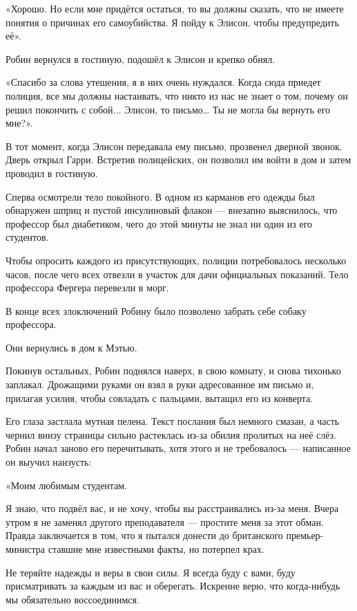 \documentclass[a5paper, 9pt,
final, openany, twoside=true]{memoir}
\begin{document}
«Хорошо. Но если мне придётся остаться, то вы должны сказать, что не имеете понятия о причинах его самоубийства. Я пойду к Элисон, чтобы предупредить её».

Робин вернулся в гостиную, подошёл к Элисон и крепко обнял.

«Спасибо за слова утешения, я в них очень нуждался. Когда сюда приедет полиция, все мы должны настаивать, что никто из нас не знает о том, почему он решил покончить с собой... Элисон, то письмо… Ты не могла бы вернуть его мне?».

В тот момент, когда Элисон передавала ему письмо, прозвенел дверной звонок. Дверь открыл Гарри. Встретив полицейских, он позволил им войти в дом и затем проводил в гостиную.

Сперва осмотрели тело покойного. В одном из карманов его одежды был обнаружен шприц и пустой инсулиновый флакон — внезапно выяснилось, что профессор был диабетиком, чего до этой минуты не знал ни один из его студентов.

Чтобы опросить каждого из присутствующих, полиции потребовалось несколько часов, после чего всех отвезли в участок для дачи официальных показаний. Тело профессора Фергера перевезли в морг.

В конце всех злоключений Робину было позволено забрать себе собаку профессора.\bigskip

Они вернулись в дом к Мэтью.

Покинув остальных, Робин поднялся наверх, в свою комнату, и снова тихонько заплакал. Дрожащими руками он взял в руки адресованное им письмо и, прилагая усилия, чтобы совладать с пальцами, вытащил его из конверта.

Его глаза застлала мутная пелена. Текст послания был немного смазан, а часть чернил внизу страницы сильно растеклась из-за обилия пролитых на неё слёз. Робин начал заново его перечитывать, хотя этого и не требовалось — написанное он выучил наизусть:\bigskip

«Моим любимым студентам.\bigskip

Я знаю, что подвёл вас, и не хочу, чтобы вы расстраивались из-за меня. Вчера утром я не заменял другого преподавателя — простите меня за этот обман. Правда заключается в том, что я пытался донести до британского премьер-министра ставшие мне известными факты, но потерпел крах.

Не теряйте надежды и веры в свои силы. Я всегда буду с вами, буду присматривать за каждым из вас и оберегать. Искренне верю, что когда-нибудь мы обязательно воссоединимся.
\end{document}
